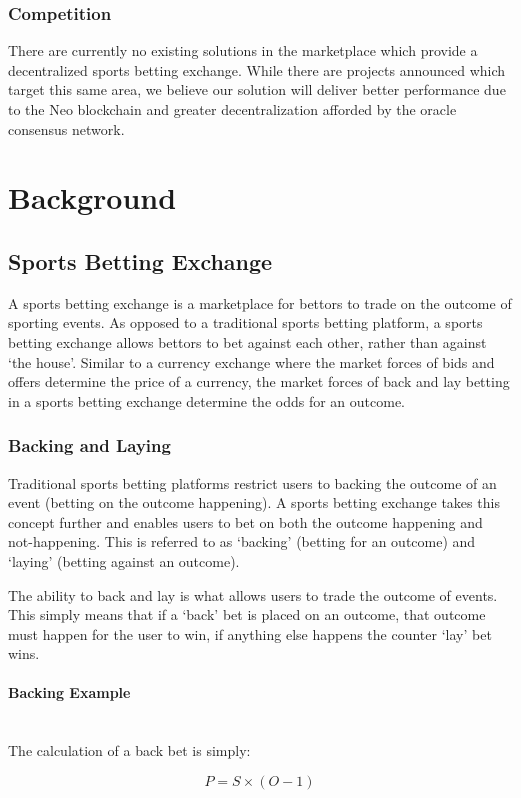 \documentclass{article}
\newcommand{\myparagraph}[1]{\paragraph{#1}\mbox{}\\ \newline}
\begin{document}
		\subsubsection{Competition}
There are currently no existing solutions in the marketplace which provide a decentralized sports betting exchange. While there are projects announced which target this same area, we believe our solution will deliver better performance due to the Neo blockchain and greater decentralization afforded by the oracle consensus network.

\pagebreak

\section{Background}

	\subsection{Sports Betting Exchange}
A sports betting exchange is a marketplace for bettors to trade on the outcome of sporting events. As opposed to a traditional sports betting platform, a sports betting exchange allows bettors to bet against each other, rather than against ‘the house’. Similar to a currency exchange where the market forces of bids and offers determine the price of a currency, the market forces of back and lay betting in a sports betting exchange determine the odds for an outcome.

		\subsubsection{Backing and Laying}
Traditional sports betting platforms restrict users to backing the outcome of an event (betting on the outcome happening). A sports betting exchange takes this concept further and enables users to bet on both the outcome happening and not-happening. This is referred to as ‘backing’ (betting for an outcome) and ‘laying’ (betting against an outcome).

The ability to back and lay is what allows users to trade the outcome of events. This simply means that if a ‘back’ bet is placed on an outcome, that outcome must happen for the user to win, if anything else happens the counter ‘lay’ bet wins.

				\myparagraph{Backing Example}
\medskip
The calculation of a back bet is simply:

\begin{equation}
P = S\times(O - 1)\label{eq:backing}
\end{equation}
\end{document}
